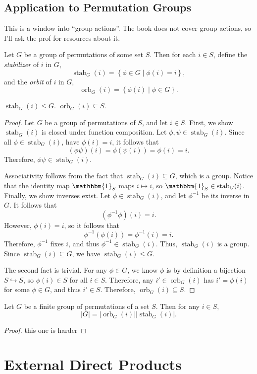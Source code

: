 \section{Application to Permutation Groups}
This is a window into ``group actions''. The book does not cover group actions, so I'll ask the prof for resources about it.
\begin{definition}\label{dfn:lk}
	Let $G$ be a group of permutations of some set $S$. Then for each $i\in S$, define the \emph{stabilizer} of $i$ in $G$,
	\[
		\operatorname{stab}_G(i) =\left\{ \phi \in G \mid \phi (i)=i \right\} 
	,\]
	and the \emph{orbit} of $i$ in $G$,
	\[
		\operatorname{orb}_G(i) =\left\{ \phi (i) \mid \phi \in G \right\} 
	.\]
\end{definition}
\begin{theorem}\label{thm:ksnd}
	$\operatorname{stab}_G(i) \leq G$. $\operatorname{orb}_G(i) \subseteq S$.
\end{theorem}
\begin{proof}
	Let $G$ be a group of permutations of $S$, and let $i\in S$. First, we show $\operatorname{stab}_G(i) $ is closed under function composition. Let $\phi ,\psi \in \operatorname{stab}_G(i) $. Since all $\phi \in \operatorname{stab}_G(i) $, have $\phi (i)=i$, it follows that
	\[
		\left( \phi \psi  \right) (i)=\phi (\psi (i))=\phi (i)=i
	.\]
	Therefore, $\phi \psi \in \operatorname{stab}_G(i) $.

	Associativity follows from the fact that $\operatorname{stab}_G(i) \subseteq G$, which is a group. Notice that the identity map $\mathbbm{1}_S$ maps $i\mapsto i$, so $\mathbbm{1}_S\in \operatorname{stab}_G(i) $. Finally, we show inverses exist. Let $\phi \in \operatorname{stab}_G(i) $, and let $\phi ^{-1}$ be its inverse in $G$. It follows that
	\[
		\left( \phi ^{-1}\phi  \right) (i)=i
	.\]
	However, $\phi (i)=i$, so it follows that
	\[
		\phi ^{-1}(\phi (i))=\phi ^{-1}(i)=i
	.\]
	Therefore, $\phi ^{-1}$ fixes $i$, and thus $\phi ^{-1}\in \operatorname{stab}_G(i) $. Thus, $\operatorname{stab}_G(i) $ is a group. Since $\operatorname{stab}_G(i) \subseteq G$, we have $\operatorname{stab}_G(i) \leq G$.

	The second fact is trivial. For any $\phi \in G$, we know $\phi $ is by definition a bijection $S\hookrightarrow S$, so $\phi (i)\in S$ for all $i\in S$. Therefore, any $i'\in \operatorname{orb}_G(i) $ has $i'=\phi (i)$ for some $\phi \in G$, and thus $i'\in S$. Therefore, $\operatorname{orb}_G(i) \subseteq S$.
\end{proof}
\begin{theorem}\label{thm:a}
	Let $G$ be a finite group of permutations of a set $S$. Then for any  $i\in S$,
	\[
		\left| G \right| =\left| \operatorname{orb}_G(i)  \right| \left| \operatorname{stab}_G(i)  \right| 
	.\]
\end{theorem}
\begin{proof}
	this one is harder
\end{proof}
\chapter{External Direct Products}
